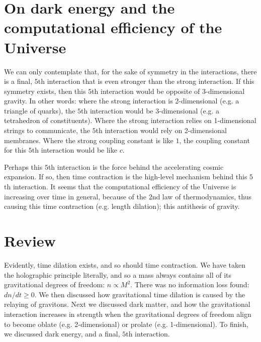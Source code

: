 \documentclass[12pt]{article}
\begin{document}
{\section{On dark energy and the computational efficiency of the Universe}

We can only contemplate that, for the sake of symmetry in the interactions, there is a final, $5$th interaction that is even stronger than the strong interaction.
If this symmetry exists, then this $5$th interaction would be opposite of 3-dimensional gravity.
In other words: where the strong interaction is 2-dimensional (e.g. a triangle of quarks), the $5$th interaction would be 3-dimensional (e.g. a tetrahedron of constituents).
Where the strong interaction relies on 1-dimensional strings to communicate, the $5$th interaction would rely on 2-dimensional membranes.
Where the strong coupling constant is like $1$, the coupling constant for this $5$th interaction would be like $c$.


Perhaps this $5$th interaction is the force behind the accelerating cosmic expansion.
If so, then time contraction is the high-level mechanism behind this $5$th interaction.
It seems that the computational efficiency of the Universe is increasing over time in general, because of the $2$nd law of thermodynamics, thus causing this time contraction (e.g. length dilation); this antithesis of gravity.








\section{Review}

Evidently, time dilation exists, and so should time contraction.
We have taken the holographic principle literally, and so a mass always contains all of its gravitational degrees of freedom: $n \propto M^2$.
There was no information loss found: $dn/dt \geq 0$.
We then discussed how gravitational time dilation is caused by the relaying of gravitons.
Next we discussed dark matter, and how the gravitational interaction increases in strength when the gravitational degrees of freedom align to become oblate (e.g. 2-dimensional) or prolate (e.g. 1-dimensional).
To finish, we discussed dark energy, and a final, $5$th interaction.

}
\end{document}
